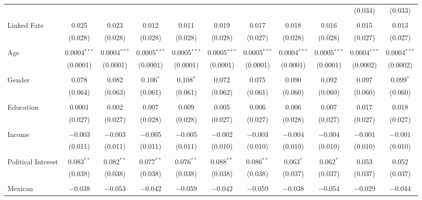 \begin{table}[!htbp]
\begin{tabular}{@{\extracolsep{5pt}}lcccccccccc}
  &  &  &  &  &  &  &  &  & (0.034) & (0.033) \\ 
  & & & & & & & & & & \\ 
 Linked Fate & 0.025 & 0.023 & 0.012 & 0.011 & 0.019 & 0.017 & 0.018 & 0.016 & 0.015 & 0.013 \\ 
  & (0.028) & (0.028) & (0.028) & (0.028) & (0.028) & (0.027) & (0.028) & (0.028) & (0.027) & (0.027) \\ 
  & & & & & & & & & & \\ 
 Age & 0.0004$^{***}$ & 0.0004$^{***}$ & 0.0005$^{***}$ & 0.0005$^{***}$ & 0.0005$^{***}$ & 0.0005$^{***}$ & 0.0004$^{***}$ & 0.0005$^{***}$ & 0.0004$^{***}$ & 0.0004$^{***}$ \\ 
  & (0.0001) & (0.0001) & (0.0001) & (0.0001) & (0.0001) & (0.0001) & (0.0001) & (0.0001) & (0.0002) & (0.0002) \\ 
  & & & & & & & & & & \\ 
 Gender & 0.078 & 0.082 & 0.106$^{*}$ & 0.108$^{*}$ & 0.072 & 0.075 & 0.090 & 0.092 & 0.097 & 0.099$^{*}$ \\ 
  & (0.064) & (0.063) & (0.061) & (0.061) & (0.062) & (0.061) & (0.060) & (0.060) & (0.060) & (0.060) \\ 
  & & & & & & & & & & \\ 
 Education & 0.0001 & 0.002 & 0.007 & 0.009 & 0.005 & 0.006 & 0.006 & 0.007 & 0.017 & 0.018 \\ 
  & (0.027) & (0.027) & (0.028) & (0.028) & (0.027) & (0.027) & (0.028) & (0.027) & (0.027) & (0.027) \\ 
  & & & & & & & & & & \\ 
 Income & $-$0.003 & $-$0.003 & $-$0.005 & $-$0.005 & $-$0.002 & $-$0.003 & $-$0.004 & $-$0.004 & $-$0.001 & $-$0.001 \\ 
  & (0.011) & (0.011) & (0.011) & (0.011) & (0.010) & (0.010) & (0.010) & (0.010) & (0.010) & (0.010) \\ 
  & & & & & & & & & & \\ 
 Political Interest & 0.083$^{**}$ & 0.082$^{**}$ & 0.077$^{**}$ & 0.076$^{**}$ & 0.088$^{**}$ & 0.086$^{**}$ & 0.063$^{*}$ & 0.062$^{*}$ & 0.053 & 0.052 \\ 
  & (0.038) & (0.038) & (0.038) & (0.038) & (0.038) & (0.038) & (0.037) & (0.037) & (0.037) & (0.037) \\ 
  & & & & & & & & & & \\ 
 Mexican & $-$0.038 & $-$0.053 & $-$0.042 & $-$0.059 & $-$0.042 & $-$0.059 & $-$0.038 & $-$0.054 & $-$0.029 & $-$0.044 \\ 

\end{tabular}
\end{table}
